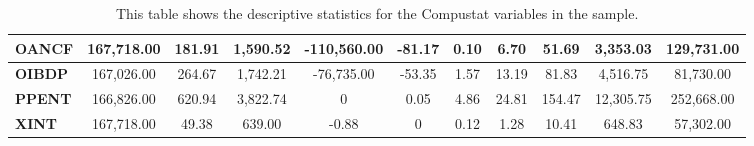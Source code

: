 {{\begin{table}[htb!]
{\begin{tabular}{|l|c|c|c|c|c|c|c|c|c|c|}
\textbf{OANCF}    & 167,718.00                          & 181.91                             & 1,590.52                          & -110,560.00                       & -81.17                            & 0.10                               & 6.70                               & 51.69                              & 3,353.03                           & 129,731.00                        \\ \hline
\textbf{OIBDP}    & 167,026.00                          & 264.67                             & 1,742.21                          & -76,735.00                        & -53.35                            & 1.57                               & 13.19                              & 81.83                              & 4,516.75                           & 81,730.00                         \\ \hline
\textbf{PPENT}    & 166,826.00                          & 620.94                             & 3,822.74                          & 0                                 & 0.05                              & 4.86                               & 24.81                              & 154.47                             & 12,305.75                          & 252,668.00                        \\ \hline
\textbf{XINT}     & 167,718.00                          & 49.38                              & 639.00                            & -0.88                             & 0                                 & 0.12                               & 1.28                               & 10.41                              & 648.83                             & 57,302.00                         \\ \hline
\end{tabular}}
\caption{This table shows the descriptive statistics for the Compustat variables in the sample.}
\label{tab:CompustatDescribe}
\end{table}

}}
